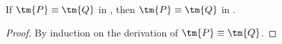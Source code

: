 \begin{theorem}\label{thm:cp2hcp-equiv}
  If $\tm{P}\equiv\tm{Q}$ in \cp, then $\tm{P}\equiv\tm{Q}$ in \hcp.
\end{theorem}
\begin{proof}
  By induction on the derivation of $\tm{P}\equiv\tm{Q}$.
\end{proof}
